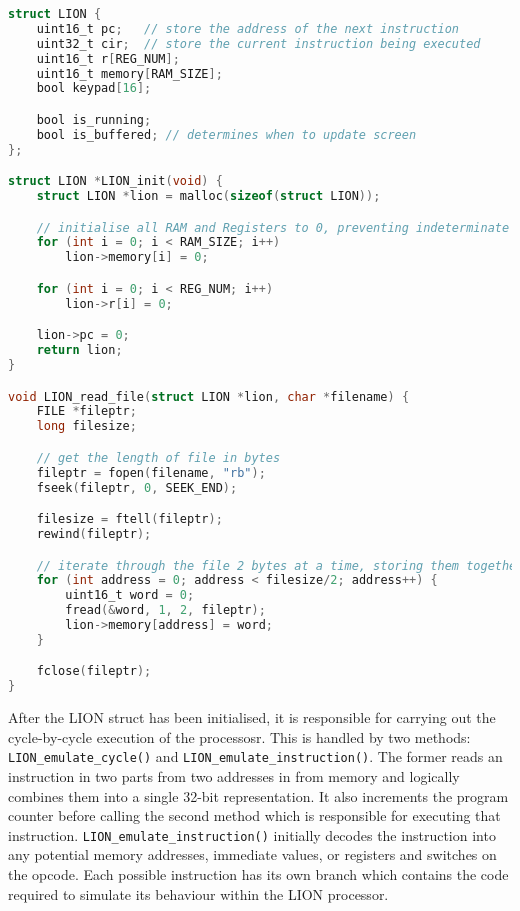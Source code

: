 \label{LIONReadFile}
\begin{lstlisting}[language=C]
struct LION {
    uint16_t pc;   // store the address of the next instruction
    uint32_t cir;  // store the current instruction being executed
    uint16_t r[REG_NUM];
    uint16_t memory[RAM_SIZE];
    bool keypad[16];

    bool is_running;
    bool is_buffered; // determines when to update screen
};

struct LION *LION_init(void) {
    struct LION *lion = malloc(sizeof(struct LION));

    // initialise all RAM and Registers to 0, preventing indeterminate values
    for (int i = 0; i < RAM_SIZE; i++)
        lion->memory[i] = 0;

    for (int i = 0; i < REG_NUM; i++)
        lion->r[i] = 0;

    lion->pc = 0;
    return lion;
}

void LION_read_file(struct LION *lion, char *filename) {
    FILE *fileptr;
    long filesize;

    // get the length of file in bytes
    fileptr = fopen(filename, "rb");
    fseek(fileptr, 0, SEEK_END);

    filesize = ftell(fileptr);
    rewind(fileptr);

    // iterate through the file 2 bytes at a time, storing them together as a word in memory
    for (int address = 0; address < filesize/2; address++) {
        uint16_t word = 0;
        fread(&word, 1, 2, fileptr);
        lion->memory[address] = word;
    }

    fclose(fileptr);
}   
\end{lstlisting}

After the LION struct has been initialised, it is responsible for carrying out the cycle-by-cycle execution of the processosr. This is handled by two methods: \texttt{LION\_emulate\_cycle()} and \texttt{LION\_emulate\_instruction()}. The former reads an instruction in two parts from two addresses in from memory and logically combines them into a single 32-bit representation. It also increments the program counter before calling the second method which is responsible for executing that instruction. \texttt{LION\_emulate\_instruction()} initially decodes the instruction into any potential memory addresses, immediate values, or registers and switches on the opcode. Each possible instruction has its own branch which contains the code required to simulate its behaviour within the LION processor.

